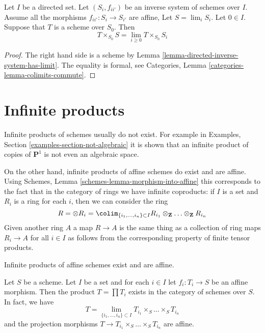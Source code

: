 \begin{lemma}
\label{lemma-scheme-over-limit}
Let $I$ be a directed set.
Let $(S_i, f_{ii'})$ be an inverse system of schemes over $I$.
Assume all the morphisms $f_{ii'} : S_i \to S_{i'}$ are affine,
Let $S = \lim_i S_i$. Let $0 \in I$.
Suppose that $T$ is a scheme over $S_0$.
Then
$$
T \times_{S_0} S = \lim_{i \geq 0} T \times_{S_0} S_i
$$
\end{lemma}

\begin{proof}
The right hand side is a scheme by
Lemma \ref{lemma-directed-inverse-system-has-limit}.
The equality is formal, see
Categories, Lemma \ref{categories-lemma-colimits-commute}.
\end{proof}



\section{Infinite products}
\label{section-inifinite-products}

\noindent
Infinite products of schemes usually do not exist. For example in
Examples, Section \ref{examples-section-not-algebraic}
it is shown that an infinite product of
copies of $\mathbf{P}^1$ is not even an algebraic space.

\medskip\noindent
On the other hand, infinite products of affine schemes do exist
and are affine. Using Schemes, Lemma \ref{schemes-lemma-morphism-into-affine}
this corresponds to the fact that in the category of rings
we have infinite coproducts: if $I$ is a set and $R_i$ is a ring
for each $i$, then we can consider the ring
$$
R = \otimes R_i =
\colim_{\{i_1, \ldots, i_n\} \subset I}
R_{i_1} \otimes_\mathbf{Z} \ldots \otimes_\mathbf{Z} R_{i_n}
$$
Given another ring $A$ a map $R \to A$ is the same thing as a
collection of ring maps $R_i \to A$ for all $i \in I$ as
follows from the corresponding property of finite tensor products.

\begin{lemma}
\label{lemma-infinite-product}
\begin{slogan}
Infinite products of affine schemes exist and are affine.
\end{slogan}
Let $S$ be a scheme. Let $I$ be a set and for each $i \in I$
let $f_i : T_i \to S$ be an affine morphism. Then the
product $T = \prod T_i$ exists in the category of schemes
over $S$. In fact, we have
$$
T = \lim_{\{i_1, \ldots, i_n\} \subset I}
T_{i_1} \times_S \ldots \times_S T_{i_n}
$$
and the projection morphisms $T \to T_{i_1} \times_S \ldots \times_S T_{i_n}$
are affine.
\end{lemma}

